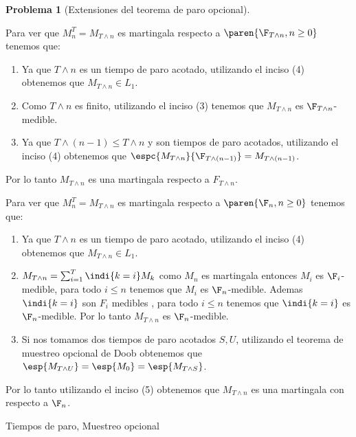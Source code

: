 \documentclass[a5paper,oneside]{amsart}
\theoremstyle{plain}
\theoremstyle{definition}
\newtheorem{problema}{Problema}
\begin{document}
\begin{problema}[Extensiones del teorema de paro opcional]
\begin{enumerate}
                Para ver que $M^T_n=M_{T\wedge n}$ es martingala respecto a  $\paren{\F_{T\wedge n},n\geq 0}$ tenemos que:
                \begin{enumerate}
                \item Ya que $T\wedge n$ es un tiempo de paro acotado, utilizando el inciso (4) obtenemos que $M_{T\wedge n}\in L_1$.
                \item Como $T\wedge n$ es finito, utilizando el inciso (3) tenemos que $M_{T\wedge n}$ es $\F_{T\wedge n}$-medible.
                \item Ya que $T\wedge (n-1) \leq T\wedge n$  y son tiempos de paro acotados, utilizando el inciso (4) obtenemos que $\espc{M_{T\wedge n}}{\F_{T\wedge (n-1)}}=M_{T\wedge (n-1)}$.
                \end{enumerate}
                
                Por lo tanto $M_{T\wedge n}$ es una martingala respecto a $F_{T\wedge n}$.
                
                Para ver que $M^T_n=M_{T\wedge n}$ es martingala respecto a  $\paren{\F_{n},n\geq 0}$ tenemos que:
                \begin{enumerate}
                \item  Ya que $T\wedge n$ es un tiempo de paro acotado, utilizando el inciso (4) obtenemos que $M_{T\wedge n}\in L_1$.
                \item $M_{T\wedge n}=\sum_{i=1}^T \indi{k=i} M_k$ como $M_n$ es martingala entonces $M_i$ es $\F_i$-medible, para todo $i\leq n$ tenemos que $M_i$ es $\F_n$-medible. Ademas $\indi{k=i}$ son $F_i$ medibles , para todo $i\leq n$ tenemos que $\indi{k=i}$ es $\F_n$-medible. Por lo tanto $M_{T\wedge n}$ es $\F_n$-medible.
                \item Si nos tomamos dos tiempos de paro acotados $S,U$, utilizando el teorema de muestreo opcional de Doob obtenemos que $\esp{M_{T \wedge U}}=\esp{M_0}=\esp{M_{T \wedge S}}$.
                \end{enumerate}
                
                Por lo tanto  utilizando el inciso (5) obtenemos que $M_{T\wedge n}$ es una martingala con respecto a $\F_n$.
\end{enumerate}

Tiempos de paro, Muestreo opcional
\end{problema}
\end{document}
